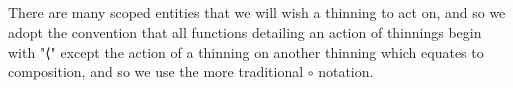 \begin{code}%
\>[0]\AgdaSpace{}%
\AgdaSymbol{:}\AgdaSpace{}%
\AgdaSpace{}%
\AgdaSpace{}%
\<%
\\
\>[0]\AgdaSpace{}%
\AgdaSpace{}%
\AgdaSymbol{=}\AgdaSpace{}%
\AgdaSpace{}%
\AgdaSymbol{\{}\AgdaSymbol{\}}\AgdaSpace{}%
\AgdaSymbol{\{}\AgdaSymbol{\}}\AgdaSpace{}%
\AgdaSpace{}%
\AgdaSpace{}%
\AgdaSpace{}%
\AgdaSpace{}%
\AgdaSymbol{(}\AgdaSpace{}%
\AgdaSpace{}%
\AgdaSymbol{)}\AgdaSpace{}%
\AgdaSpace{}%
\AgdaSpace{}%
\<%
\\
%
\\[\AgdaEmptyExtraSkip]%
\>[0]\AgdaSpace{}%
\AgdaSymbol{:}\AgdaSpace{}%
\AgdaSpace{}%
\AgdaSpace{}%
\<%
\\
\>[0]\AgdaSpace{}%
\AgdaSpace{}%
\AgdaSymbol{=}\AgdaSpace{}%
\AgdaSpace{}%
\AgdaSymbol{\{}\AgdaSymbol{\}}\AgdaSpace{}%
\AgdaSymbol{\{}\AgdaSymbol{\}}\AgdaSpace{}%
\AgdaSpace{}%
\AgdaSymbol{(}\AgdaSpace{}%
\AgdaSpace{}%
\AgdaSymbol{)}\AgdaSpace{}%
\AgdaSpace{}%
\AgdaSpace{}%
\AgdaSpace{}%
\AgdaSpace{}%
\AgdaSpace{}%
\<%
\end{code}

There are many scoped entities that we will wish a thinning to act on,
and so we adopt the convention that all functions detailing an action
of thinnings begin with "⟨" except the action of a thinning on another
thinning which equates to composition, and so we use the more traditional
$∘$ notation.

\begin{code}%
\>[0]%
\>[10]\AgdaSymbol{:}\AgdaSpace{}%
\AgdaSpace{}%
\AgdaSymbol{(}\AgdaSpace{}%
\AgdaSymbol{)}\<%
\\
\>[0]%
\>[10]\AgdaSymbol{:}\AgdaSpace{}%
\AgdaSpace{}%
\<%
\\
\>[0]%
\>[10]\AgdaSymbol{:}\AgdaSpace{}%
\AgdaSpace{}%
\AgdaSymbol{(}\AgdaSpace{}%
\AgdaSymbol{)}\<%
\end{code}

